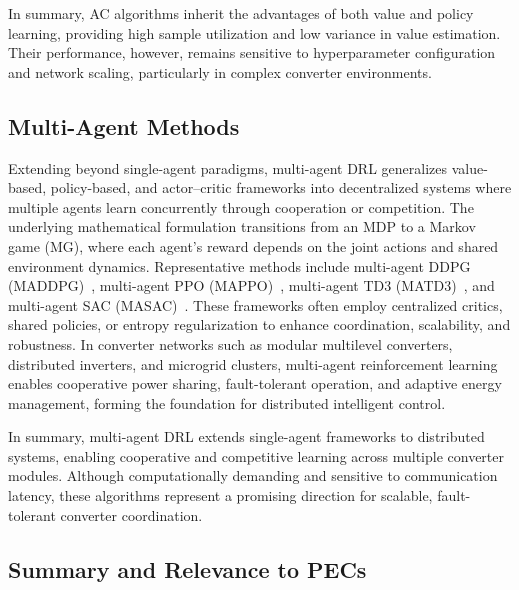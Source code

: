 In summary, AC algorithms inherit the advantages of both value and policy learning, providing high sample utilization and low variance in value estimation. 
Their performance, however, remains sensitive to hyperparameter configuration and network scaling, particularly in complex converter environments.

\subsection{Multi-Agent Methods}
\label{sec:multi_agent_methods}

Extending beyond single-agent paradigms, multi-agent DRL generalizes value-based, policy-based, and actor–critic frameworks into decentralized systems where multiple agents learn concurrently through cooperation or competition. 
The underlying mathematical formulation transitions from an MDP to a Markov game (MG), where each agent’s reward depends on the joint actions and shared environment dynamics. 
Representative methods include multi-agent DDPG (MADDPG)~\cite{lowe2017multi}, multi-agent PPO (MAPPO)~\cite{yu2022surprising}, multi-agent TD3 (MATD3)~\cite{ackermann2019reducing}, and multi-agent SAC (MASAC)~\cite{kuba2021trust}. 
These frameworks often employ centralized critics, shared policies, or entropy regularization to enhance coordination, scalability, and robustness. 
In converter networks such as modular multilevel converters, distributed inverters, and microgrid clusters, multi-agent reinforcement learning enables cooperative power sharing, fault-tolerant operation, and adaptive energy management, forming the foundation for distributed intelligent control.

In summary, multi-agent DRL extends single-agent frameworks to distributed systems, enabling cooperative and competitive learning across multiple converter modules. 
Although computationally demanding and sensitive to communication latency, these algorithms represent a promising direction for scalable, fault-tolerant converter coordination.

\subsection{Summary and Relevance to PECs}
\label{sec:drl_summary}

